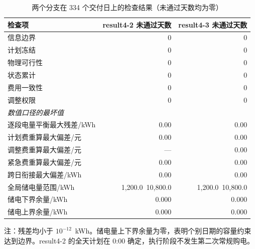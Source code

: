 \begin{table}[htbp]
  \centering
  \caption{两个分支在 334 个交付日上的检查结果（未通过天数均为零）}
  \label{tab:p4-check}
  \small
  \begin{tabular}{lrr}
    \toprule
    检查项 & result4-2 未通过天数 & result4-3 未通过天数 \\
    \midrule
    信息边界 & 0 & 0 \\
    计划冻结 & 0 & 0 \\
    物理可行性 & 0 & 0 \\
    状态累计 & 0 & 0 \\
    费用一致性 & 0 & 0 \\
    调整权限 & 0 & 0 \\
    \midrule
    \multicolumn{3}{l}{\textit{数值口径的最坏值}} \\
    \midrule
    逐段电量平衡最大残差/kWh & $0.00$ & $0.00$ \\
    计划费重算最大偏差/元 & $0.00$ & $0.00$ \\
    调整费重算最大偏差/元 & --- & $0.00$ \\
    紧急费重算最大偏差/元 & $0.00$ & $0.00$ \\
    跨日衔接最大偏差/kWh & $0.00$ & $0.00$ \\
    全局储电量范围/kWh & 1,200.0~10,800.0 & 1,200.0~10,800.0 \\
    \midrule
    储电下界余量/kWh & 0.000 & 0.000 \\
    储电上界余量/kWh & 0.000 & 0.000 \\
    \bottomrule
  \end{tabular}
  \par\vspace{2pt}
  \begin{minipage}{\textwidth}\footnotesize
    注：残差均小于 $10^{-12}$~kWh。储电量上下界余量为零，表明个别日期的容量约束达到边界。result4-2 的全天计划在 0:00 确定，执行阶段不发生第二次常规购电。
  \end{minipage}
\end{table}
